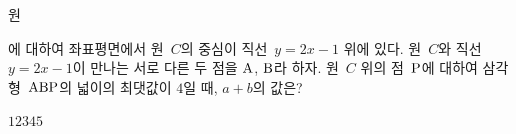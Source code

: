 원 \par\smallskip{}\par\smallskip\noindent 에 대하여 좌표평면에서 원~$C$의 중심이 직선~$y=2x-1$ 위에 있다. 원~$C$와 직선~$y=2x-1$이 만나는 서로 다른 두 점을 $\mathrm{A}$, $\mathrm{B}$라 하자. 원~$C$ 위의 점~$\mathrm{P}$에 대하여 삼각형~$\mathrm{ABP}$의 넓이의 최댓값이 $4$일 때, $a+b$의 값은? 
\begin{choices32}{$1$}{$2$}{$3$}{$4$}{$5$}\end{choices32}
